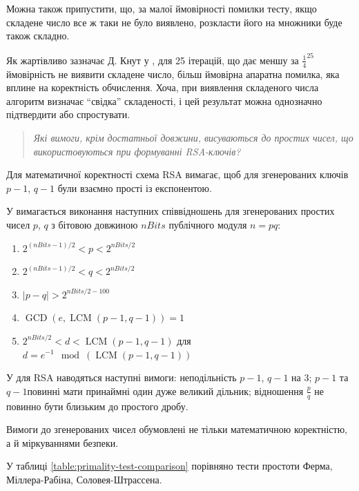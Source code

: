 \documentclass{kpi-lab}
\begin{document}
Можна також припустити, що, за малої ймовірності помилки тесту,
якщо складене число все ж таки не було виявлено, розкласти
його на множники буде також складно.

Як жартівливо зазначає Д. Кнут у \cite[][\pagename 395]{Knuth2021},
для 25 ітерацій, що дає меншу за \(\frac{1}{4}^25\)
ймовірність не виявити складене число,
більш ймовірна апаратна помилка, яка вплине на коректність обчислення.
Хоча, при виявлення складеного числа алгоритм визначає
\enquote{свідка} складеності,
і цей результат можна однозначно підтвердити або спростувати.

\begin{quote}\small\it
  Які вимоги, крім достатньої довжини, висуваються до
  простих чисел, що використовуються при формуванні RSA-ключів?
\end{quote}

Для математичної коректності схема RSA вимагає, щоб для згенерованих
ключів \(p-1\), \(q-1\) були взаємно прості із експонентою.

У \cite{2023} вимагається виконання наступних співвідношень
для згенерованих простих чисел \(p\), \(q\) з бітовою довжиною
\(\mathit{nBits}\) публічного модуля \(n = pq\):
\begin{enumerate}[label=\alph*.]
  \item \( 2^{(\mathit{nBits}-1)/2} < p < 2^{\mathit{nBits}/2}\)
  \item \( 2^{(\mathit{nBits}-1)/2} < q < 2^{\mathit{nBits}/2}\)
  \item \(|p - q| > 2^{\mathit{nBits}/2 - 100}\)
  \item \(\operatorname{GCD}(e, \operatorname{LCM}(p-1,q-1)) = 1\)
  \item \(2^{\mathit{nBits}/2} < d < \operatorname{LCM}(p-1,q-1)\)
    для \(d = e ^{-1} \mod (\operatorname{LCM}(p-1, q-1))\)
\end{enumerate}

У \cite[][\pagename 405]{Knuth2021} для RSA
наводяться наступні вимоги: неподільність \(p-1\), \(q-1\) на 3;
\(p-1\) та \(q-1\)повинні мати принаймні один дуже великий дільник;
відношення \(\frac{p}{q}\) не повинно бути близьким до простого дробу.

Вимоги до згенерованих чисел обумовлені не тільки
математичною коректністю, а й міркуваннями безпеки.

У таблиці \ref{table:primality-test-comparison} порівняно
тести простоти Ферма, Міллера-Рабіна, Соловея-Штрассена.
\end{document}
